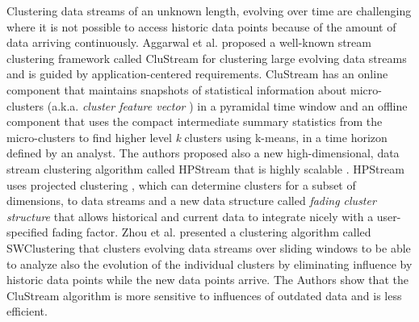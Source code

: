 Clustering data streams of an unknown length, evolving over time \citep{Aggarwal:2002, Aggarwal:2003Evolving} are challenging where it is not possible to access historic data points because of the amount of data arriving continuously. Aggarwal et al. \citep{Aggarwal:2003} proposed a well-known stream clustering framework called CluStream for clustering large evolving data streams and is guided by application-centered requirements. CluStream has an online component that maintains snapshots of statistical information about micro-clusters (a.k.a. \textit{cluster feature vector} \citep{Zhang:1996}) in a pyramidal time window and an offline component that uses the compact intermediate summary statistics from the micro-clusters to find higher level \textit{k} clusters using k-means, in a time horizon defined by an analyst. The authors proposed also a new high-dimensional, data stream clustering algorithm called HPStream that is highly scalable \citep{Aggarwal:2004}. HPStream uses projected clustering \citep{Aggarwal:1999}, which can determine clusters for a subset of dimensions, to data streams and a new data structure called \textit{fading cluster structure} that allows historical and current data to integrate nicely with a user-specified fading factor. Zhou et al. \citep{Zhou:2008} presented a clustering algorithm called SWClustering that clusters evolving data streams over sliding windows to be able to analyze also the evolution of the individual clusters by eliminating influence by historic data points while the new data points arrive. The Authors show that the CluStream algorithm is more sensitive to influences of outdated data and is less efficient.


